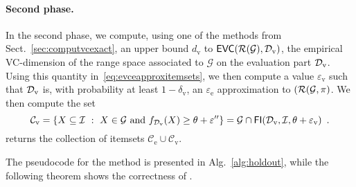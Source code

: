 \paragraph{Second phase.} In the second phase, we compute, using one of the
methods from Sect.~\ref{sec:computvcexact}, an upper bound $d_\mathrm{v}$ to
$\mathsf{EVC}(\mathcal{R}(\mathcal{G}),{\cal D}_\mathrm{v})$, the empirical VC-dimension of the
range space associated to $\mathcal{G}$ on the evaluation part ${\cal D}_\mathrm{v}$.
Using this quantity in~\eqref{eq:evceapproxitemsets}, we then compute a value
$\varepsilon_\mathrm{v}$ such that ${\cal D}_\mathrm{v}$ is, with probability at
least $1-\delta_\mathrm{v}$, an $\varepsilon_\mathrm{e}$ approximation to
$(\mathcal{R}(\mathcal{G},\pi)$. We then compute the set
\[
\mathcal{C}_\mathrm{v}=\{X\subseteq{\cal I} ~:~ X\in\mathcal{G} \mbox{ and }
f_{{\cal D}_\mathrm{v}}(X)\ge\theta+\varepsilon''\}=\mathcal{G}\cap\mathsf{FI}({\cal D}_\mathrm{v},{\cal I},\theta+\varepsilon_\mathrm{v})\enspace.
\]
\ALGHOLDOUT{} returns the collection of itemsets $\mathcal{C}_\mathrm{e}\cup\mathcal{C}_\mathrm{v}$.

The pseudocode for the method is presented in Alg.~\ref{alg:holdout}, while the
following theorem shows the correctness of \ALGHOLDOUT.

